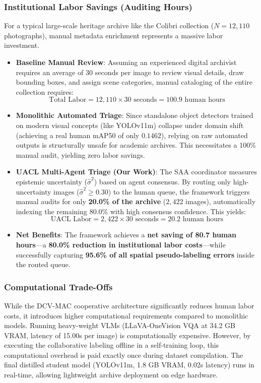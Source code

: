 \documentclass[12pt,onecolumn,a4paper]{IEEEtran}
\begin{document}
\subsubsection{Institutional Labor Savings (Auditing Hours)}
For a typical large-scale heritage archive like the Colibri collection ($N = 12,110$ photographs), manual metadata enrichment represents a massive labor investment.
\begin{itemize}
    \item \textbf{Baseline Manual Review}: Assuming an experienced digital archivist requires an average of $30$ seconds per image to review visual details, draw bounding boxes, and assign scene categories, manual cataloging of the entire collection requires:
    \begin{equation}
        \text{Total Labor} = 12,110 \times 30\text{ seconds} = 100.9\text{ human hours}
    \end{equation}
    \item \textbf{Monolithic Automated Triage}: Since standalone object detectors trained on modern visual concepts (like YOLOv11m) collapse under domain shift (achieving a real human mAP50 of only $0.1462$), relying on raw automated outputs is structurally unsafe for academic archives. This necessitates a 100\% manual audit, yielding zero labor savings.
    \item \textbf{UACL Multi-Agent Triage (Our Work)}: The SAA coordinator measures epistemic uncertainty ($\hat{\sigma}^2$) based on agent consensus. By routing only high-uncertainty images ($\hat{\sigma}^2 \ge 0.30$) to the human queue, the framework triggers manual audits for only \textbf{20.0\% of the archive} ($2,422$ images), automatically indexing the remaining 80.0\% with high consensus confidence. This yields:
    \begin{equation}
        \text{UACL Labor} = 2,422 \times 30\text{ seconds} = 20.2\text{ human hours}
    \end{equation}
    \item \textbf{Net Benefits}: The framework achieves a \textbf{net saving of 80.7 human hours}---a \textbf{80.0\% reduction in institutional labor costs}---while successfully capturing \textbf{95.6\% of all spatial pseudo-labeling errors} inside the routed queue.
\end{itemize}

\subsubsection{Computational Trade-Offs}
While the DCV-MAC cooperative architecture significantly reduces human labor costs, it introduces higher computational requirements compared to monolithic models. Running heavy-weight VLMs (LLaVA-OneVision VQA at 34.2 GB VRAM, latency of 15.00s per image) is computationally expensive. However, by executing the collaborative labeling offline in a self-training loop, this computational overhead is paid exactly once during dataset compilation. The final distilled student model (YOLOv11m, 1.8 GB VRAM, 0.02s latency) runs in real-time, allowing lightweight archive deployment on edge hardware.
\end{document}
